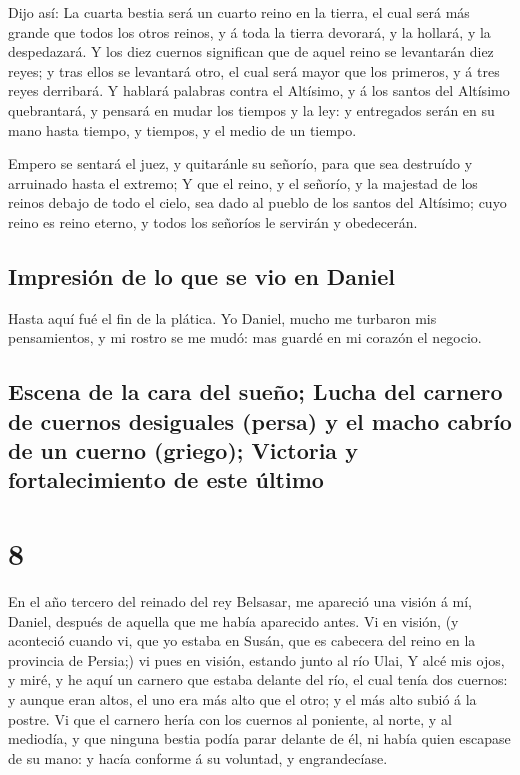 Dijo así: La cuarta bestia será un cuarto reino en la
tierra, el cual será más grande que todos los otros reinos, y á toda la
tierra devorará, y la hollará, y la despedazará.  Y los
diez cuernos significan que de aquel reino se levantarán diez reyes; y
tras ellos se levantará otro, el cual será mayor que los primeros, y á
tres reyes derribará.  Y hablará palabras contra el
Altísimo, y á los santos del Altísimo quebrantará, y pensará en mudar
los tiempos y la ley: y entregados serán en su mano hasta tiempo, y
tiempos, y el medio de un tiempo.

 Empero se sentará el juez, y quitaránle su señorío, para
que sea destruído y arruinado hasta el extremo;  Y que el
reino, y el señorío, y la majestad de los reinos debajo de todo el
cielo, sea dado al pueblo de los santos del Altísimo; cuyo reino es
reino eterno, y todos los señoríos le servirán y obedecerán.

\hypertarget{impresiuxf3n-de-lo-que-se-vio-en-daniel}{%
\subsection{Impresión de lo que se vio en
Daniel}\label{impresiuxf3n-de-lo-que-se-vio-en-daniel}}

 Hasta aquí fué el fin de la plática. Yo Daniel, mucho me
turbaron mis pensamientos, y mi rostro se me mudó: mas guardé en mi
corazón el negocio.

\hypertarget{escena-de-la-cara-del-sueuxf1o-lucha-del-carnero-de-cuernos-desiguales-persa-y-el-macho-cabruxedo-de-un-cuerno-griego-victoria-y-fortalecimiento-de-este-uxfaltimo}{%
\subsection{Escena de la cara del sueño; Lucha del carnero de cuernos
desiguales (persa) y el macho cabrío de un cuerno (griego); Victoria y
fortalecimiento de este
último}\label{escena-de-la-cara-del-sueuxf1o-lucha-del-carnero-de-cuernos-desiguales-persa-y-el-macho-cabruxedo-de-un-cuerno-griego-victoria-y-fortalecimiento-de-este-uxfaltimo}}

\hypertarget{section-7}{%
\section{8}\label{section-7}}

 En el año tercero del reinado del rey Belsasar, me
apareció una visión á mí, Daniel, después de aquella que me había
aparecido antes.  Vi en visión, (y aconteció cuando vi,
que yo estaba en Susán, que es cabecera del reino en la provincia de
Persia;) vi pues en visión, estando junto al río Ulai,  Y
alcé mis ojos, y miré, y he aquí un carnero que estaba delante del río,
el cual tenía dos cuernos: y aunque eran altos, el uno era más alto que
el otro; y el más alto subió á la postre.  Vi que el
carnero hería con los cuernos al poniente, al norte, y al mediodía, y
que ninguna bestia podía parar delante de él, ni había quien escapase de
su mano: y hacía conforme á su voluntad, y engrandecíase.

